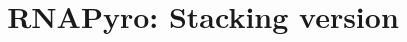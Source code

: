 \documentclass[11pt]{article} %
\title{RNAPyro: Stacking version}
\begin{document}
\maketitle
\newcommand{\Z}[3]{\mathcal{Z}_{\substack{(#1)\\ [#3]}}^{#2}}
\newcommand{\Y}[3]{\mathcal{Y}_{\substack{(#1)\\ [#3]}}^{#2}}
\newcommand{\B}{\mathcal{B}}
\newcommand{\Kron}{\delta}
\newcommand{\ub}{\bullet}


%
\end{document}
